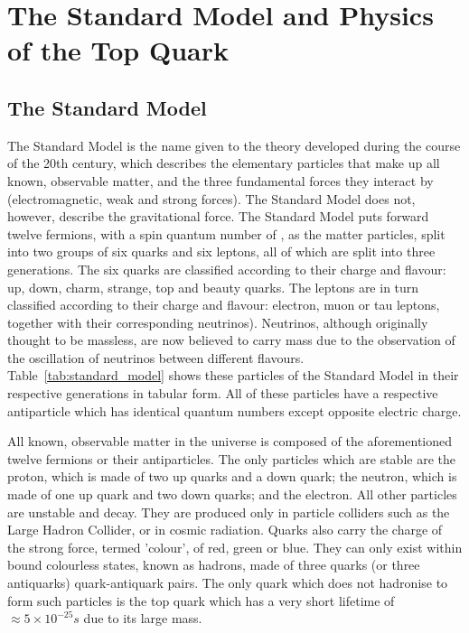\chapter{The Standard Model and Physics of the Top Quark}
\label{c:the_standard_model_and_top_physics}

\section{The Standard Model}
\label{s:the_standard_model}

The Standard Model is the name given to the theory developed during the course of the 20th century, which
describes the elementary particles that make up all known, observable matter, and the three fundamental forces
they interact by (electromagnetic, weak and strong forces). The Standard Model does not, however, describe the
gravitational force.
The Standard Model puts forward twelve fermions, with a spin quantum number of , as the matter
particles, split into two groups of six quarks and six leptons, all of which are split into three generations.
The six quarks are classified according to their charge and flavour: up, down, charm, strange, top and beauty
quarks. The leptons are in turn classified according to their charge and flavour: electron, muon or tau
leptons, together with their corresponding neutrinos). Neutrinos, although originally thought to be massless,
are now believed to carry mass due to the observation of the oscillation of neutrinos between different
flavours. Table~\ref{tab:standard_model} shows these particles of the Standard Model in their respective
generations in tabular form. All of these particles have a respective antiparticle which has identical quantum
numbers except opposite electric charge.



All known, observable matter in the universe is composed of the aforementioned twelve fermions or their
antiparticles. The only particles which are stable are the proton, which is made of two up quarks and a down
quark; the neutron, which is made of one up quark and two down quarks; and the electron. All other particles
are unstable and decay. They are produced only in particle colliders such as the Large Hadron Collider, or in
cosmic radiation. Quarks also carry the charge of the strong force, termed 'colour', of red, green or blue.
They can only exist within bound colourless states, known as hadrons, made of three quarks (or three
antiquarks) quark-antiquark pairs. The only quark which does not hadronise to form such particles is the top
quark which has a very short lifetime of $\approx 5 \times 10^{-25}s$ \cite{Agashe:2014kda} due to its large
mass.

